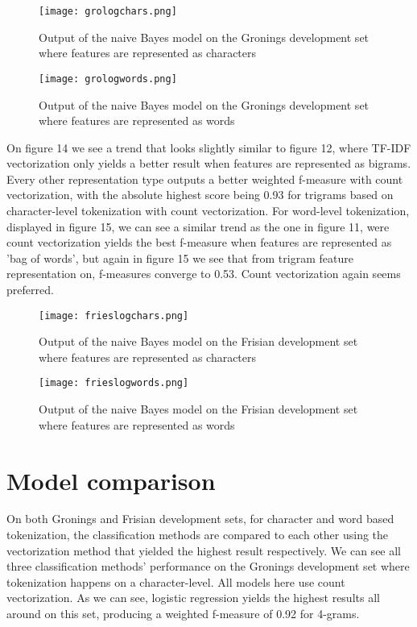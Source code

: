 \documentclass[
10pt, %
a4paper, %
oneside, %
headinclude,footinclude, %
] {book}%
\begin{document}
\begin{figure}[H]
  \texttt{[image: grologchars.png]}
  \caption{Output of the naive Bayes model on the Gronings development set where features are represented as characters}
\end{figure}

\begin{figure}[H]
  \texttt{[image: grologwords.png]}
  \caption{Output of the naive Bayes model on the Gronings development set where features are represented as words}
\end{figure}

On figure 14 we see a trend that looks slightly similar to figure 12, where TF-IDF vectorization only yields a better result when features are represented as bigrams. Every other representation type outputs a better weighted f-measure with count vectorization, with the absolute highest score being 0.93 for trigrams based on character-level tokenization with count vectorization. For word-level tokenization, displayed in figure 15, we can see a similar trend as the one in figure 11, were count vectorization yields the best f-measure when features are represented as 'bag of words', but again in figure 15 we see that from trigram feature representation on, f-measures converge to 0.53. Count vectorization again seems preferred. 
\begin{figure}[H]
  \texttt{[image: frieslogchars.png]}
  \caption{Output of the naive Bayes model on the Frisian development set where features are represented as characters}
\end{figure}

\begin{figure}[H]
  \texttt{[image: frieslogwords.png]}
  \caption{Output of the naive Bayes model on the Frisian development set where features are represented as words}
\end{figure}

\section{Model comparison}


 On both Gronings and Frisian development sets, for character and word based tokenization, the classification methods are compared to each other using the vectorization method that yielded the highest result respectively. We can see all three classification methods' performance on the Gronings development set where tokenization happens on a character-level. All models here use count vectorization. As we can see, logistic regression yields the highest results all around on this set, producing a weighted f-measure of 0.92 for 4-grams.
\end{document}
